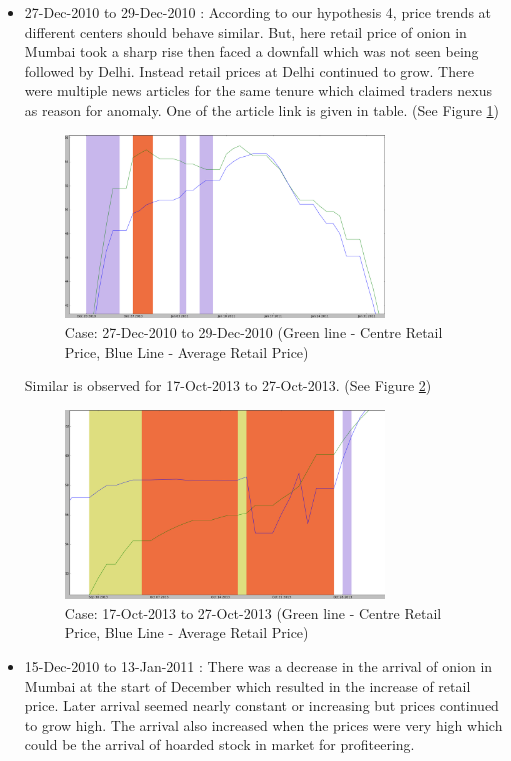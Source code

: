 \begin{itemize}
 \item 27-Dec-2010 to 29-Dec-2010 : According to our hypothesis 4, price trends at different centers should behave similar. But, here retail price of onion in Mumbai took a sharp rise then faced a downfall which was not seen being followed by Delhi. Instead retail prices at Delhi continued to grow. There were multiple news articles for the same tenure which claimed traders nexus as reason for anomaly. One of the article link is given in table. (See Figure \ref{fig:Mumbai_RetailvsAvg_ill1})
 
	\begin{figure}[H]
	\centering
	\includegraphics[width=0.8\textwidth]{graphs/Mumbai_RetailvsAvg_ill1.png}
	\caption{Case: 27-Dec-2010 to 29-Dec-2010 (Green line - Centre Retail Price, Blue Line - Average Retail Price)}
	\label{fig:Mumbai_RetailvsAvg_ill1}
	\end{figure}
  
  
  Similar is observed for 17-Oct-2013 to 27-Oct-2013. (See Figure \ref{fig:Mumbai_RetailvsAvg_ill2})
	\begin{figure}[H]
	\centering
	\includegraphics[width=0.8\textwidth]{graphs/Mumbai_RetailvsAvg_ill2.png}
	\caption{Case: 17-Oct-2013 to 27-Oct-2013 (Green line - Centre Retail Price, Blue Line - Average Retail Price)}
	\label{fig:Mumbai_RetailvsAvg_ill2}
	\end{figure}
\item 15-Dec-2010 to 13-Jan-2011 : There was a decrease in the arrival of onion in Mumbai at the start of December which resulted in the increase of retail price. Later arrival seemed nearly constant or increasing but prices continued to grow high. The arrival also increased when the prices were very high which could be the arrival of hoarded stock in market for profiteering.


\end{itemize}
